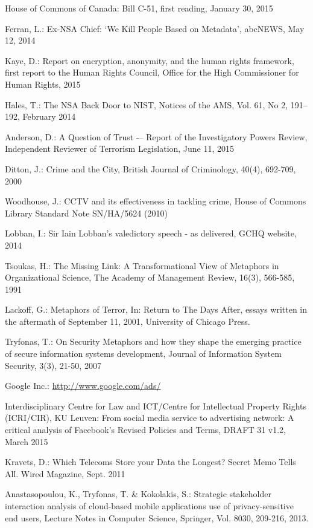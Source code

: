 \documentclass{llncs}
\begin{document}
\begin{thebibliography}{}
House of Commons of Canada:
Bill C-51, first reading, January 30, 2015

Ferran, L.:
Ex-NSA Chief: `We Kill People Based on Metadata', abcNEWS, May 12, 2014

Kaye, D.:
Report on encryption, anonymity, and the human rights framework, first report to the Human Rights Council, Office for the High Commissioner for Human Rights, 2015

Hales, T.:
The NSA Back Door to NIST, Notices of the AMS, Vol. 61, No 2, 191--192, February 2014

Anderson, D.:
A Question of Trust -– Report of the Investigatory Powers Review, Independent Reviewer of Terrorism Legislation, June 11, 2015

Ditton, J.:
Crime and the City, British Journal of Criminology, 40(4), 692-709, 2000

Woodhouse, J.:
CCTV and its effectiveness in tackling crime, House of Commons Library Standard Note SN/HA/5624 (2010)

Lobban, I.:
Sir Iain Lobban's valedictory speech - as delivered, GCHQ website, 2014

Tsoukas, H.:
The Missing Link: A Transformational View of Metaphors in Organizational Science, The Academy of Management Review, 16(3), 566-585, 1991 

Lackoff, G.:
Metaphors of Terror, In: Return to The Days After, essays written in the aftermath of September 11, 2001, University of Chicago Press. 

Tryfonas, T.:
On Security Metaphors and how they shape the emerging practice of secure information systems development, Journal of Information System Security, 3(3), 21-50, 2007

Google Inc.:
\url{http://www.google.com/ads/}

Interdisciplinary Centre for Law and ICT/Centre for Intellectual Property Rights (ICRI/CIR), KU Leuven:
From social media service to advertising network: A critical analysis of Facebook’s Revised Policies and Terms, DRAFT 31 v1.2, March 2015

Kravets, D.:
Which Telecoms Store your Data the Longest? Secret Memo Tells All. Wired Magazine, Sept. 2011

Anastasopoulou, K., Tryfonas, T. \& Kokolakis, S.:
Strategic stakeholder interaction analysis of cloud-based mobile applications use of privacy-sensitive end users, Lecture Notes in Computer Science, Springer, Vol. 8030, 209-216, 2013.


\end{thebibliography}
\end{document}
